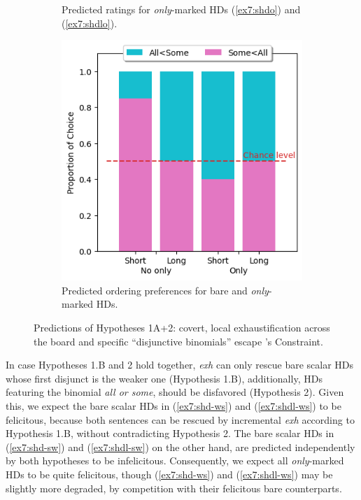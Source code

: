 \begin{figure}[H]
\begin{subfigure}[b]{.3\linewidth}
		\caption[]{Predicted ratings for \textit{only}-marked HDs (\ref{ex7:shdo}) and (\ref{ex7:shdlo}).}
	\end{subfigure}
	\hfill
	\begin{subfigure}[b]{.3\linewidth}
		\centering
		\includegraphics[width=\linewidth]{./pred-2-pref.png}
		\caption[]{Predicted ordering preferences for bare and \textit{only}-marked HDs.}
	\end{subfigure}
	\caption[]{Predictions of Hypotheses 1A+2: covert, local exhaustification across the board and specific ``disjunctive binomials'' escape \citeauthor{Hurford1974}'s Constraint.}\label{fig7:predictions-exh-atb-freq}
\end{figure} 

In case Hypotheses 1.B and 2 hold together, \textit{exh} can only rescue bare scalar HDs whose first disjunct is the weaker one (Hypothesis 1.B), additionally, HDs featuring the binomial \textit{all or some}, should be disfavored (Hypothesis 2). Given this, we expect the bare scalar HDs in (\ref{ex7:shd-ws}) and (\ref{ex7:shdl-ws}) to be felicitous, because both sentences can be rescued by incremental \textit{exh} according to Hypothesis 1.B, without contradicting Hypothesis 2. The bare scalar HDs in (\ref{ex7:shd-sw}) and (\ref{ex7:shdl-sw}) on the other hand, are predicted independently by both hypotheses to be infelicitous. Consequently, we expect all \textit{only}-marked HDs to be quite felicitous, though (\ref{ex7:shd-ws}) and (\ref{ex7:shdl-ws}) may be slightly more degraded, by competition with their felicitous bare counterparts. 


